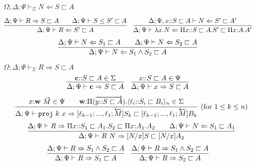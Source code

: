 \documentclass[letterpaper, 11pt]{article}
\newcommand{\Rar}{\Rightarrow}
\newcommand{\Lar}{\Leftarrow}
\newcommand{\proj}{\texttt{proj}}
\begin{document}
    $\boxed{\Omega; \Delta; \Psi \vdash_\Sigma N \Lar S \sqsubset A}$

    \begin{align*}
      & \infer{\Delta; \Psi \vdash R \Lar S' \sqsubset A}
        {
          \Delta; \Psi \vdash R \Rar S \sqsubset A
          &&
          \Delta; \Psi \vdash S \leq S' \sqsubset A
        } &
      & \infer{\Delta; \Psi \vdash \lambda x.N \Lar \Pi x{::}S \sqsubset A.S' \sqsubset \Pi x{:}A.A'}
        {
          \Delta; \Psi, x{::}S \sqsubset A \vdash N \Lar S' \sqsubset A'
        }
    \end{align*}
    \begin{align*}
      & \infer{\Delta; \Psi \vdash N \Lar S_1 \land S_2 \sqsubset A}
        {
          \Delta; \Psi \vdash N \Lar S_1 \sqsubset A
          &&
          \Delta; \Psi \vdash N \Lar S_2 \sqsubset A
        }
    \end{align*}

    $\boxed{\Omega; \Delta; \Psi \vdash_\Sigma R \Rar S \sqsubset A}$
    \begin{align*}
      & \infer{\Delta; \Psi \vdash \textbf{c} \Rar S \sqsubset A}
        {
          \textbf{c} {::} S \sqsubset A \in \Sigma
        } &
      & \infer{\Delta; \Psi \vdash x \Rar S \sqsubset A}
        {
          x {::} S \sqsubset A \in \Psi
        } 
    \end{align*}
    \begin{align*}
      \infer[(\text{for } 1 \leq k \leq n)]
            {\Delta; \Psi \vdash \proj \ k \ x \Rar [\ell_{k-1}; ..., \ell_1; \overleftarrow{M}]S_k \sqsubset [\ell_{k-1}; ..., \ell_1; \overleftarrow{M}] B_k}
            {
              x {:} \textbf{w} \ \vec{M} \in \Psi
              &&
              \textbf{w} {:} \Pi (\overrightarrow{y {::} S \sqsubset A}). \langle \ell_i {::} S_i \sqsubset B_i \rangle_n \in \Sigma
            }
    \end{align*}
    \begin{align*}
      \infer{\Delta; \Psi \vdash R \ N \Rar [N/x]S \sqsubset [N/x]A_2}
            {
              \Delta; \Psi \vdash R \Rar \Pi x{::}S_1 \sqsubset A_1. S_2 \sqsubset \Pi x{:}A_1. A_2
              &&
              \Delta; \Psi \vdash N \Lar S_1 \sqsubset A_1
            }
    \end{align*}
    \begin{align*}
      & \infer{\Delta; \Psi \vdash R \Rar S_1 \sqsubset A}
              {\Delta; \Psi \vdash R \Rar S_1 \land S_2 \sqsubset A} &
      & \infer{\Delta; \Psi \vdash R \Rar S_2 \sqsubset A}
              {\Delta; \Psi \vdash R \Rar S_1 \land S_2 \sqsubset A}
    \end{align*}
    
\end{document}
